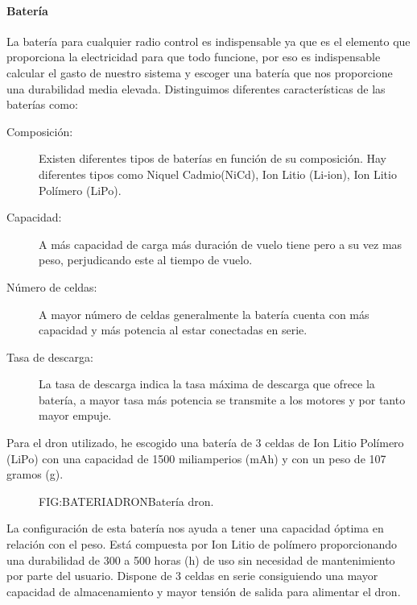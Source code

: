 \paragraph{Batería}
\label{SSS:Bateria}

 La batería para cualquier radio control es indispensable ya que es el elemento que proporciona la electricidad para que todo funcione, por eso es indispensable calcular el gasto de nuestro sistema y escoger una batería que nos proporcione una durabilidad media elevada.
 Distinguimos diferentes características de las baterías como:
 
 \begin{description}
 \item[Composición: ]  Existen diferentes tipos de baterías en función de su composición. Hay diferentes tipos como Niquel Cadmio(NiCd), Ion Litio (Li‑ion), Ion Litio Polímero (LiPo).
 \item[Capacidad: ] A más capacidad de carga más duración de vuelo tiene pero a su vez mas peso, perjudicando este al tiempo de vuelo.
 \item[Número de celdas: ] A mayor número de celdas generalmente la batería cuenta con más capacidad y más potencia al estar conectadas en serie.
 \item[Tasa de descarga: ] La tasa de descarga indica la tasa máxima de descarga que ofrece la batería, a mayor tasa más potencia se transmite a los motores y por tanto mayor empuje. 
 \end{description}

Para el dron utilizado, he escogido una batería de 3 celdas de Ion Litio Polímero (LiPo) con una capacidad de 1500 miliamperios (mAh) y con un peso de 107 gramos (g). 

	\begin{figure}[Batería dron]{FIG:BATERIADRON}{Batería dron.}
\end{figure}

La configuración de esta batería nos ayuda a tener una capacidad óptima en relación con el peso. 
Está compuesta por Ion Litio de polímero proporcionando una durabilidad de 300 a 500 horas (h) de uso sin necesidad de mantenimiento por parte del usuario. 
Dispone de 3 celdas en serie consiguiendo una mayor capacidad de almacenamiento y mayor tensión de salida para alimentar el dron.


	
